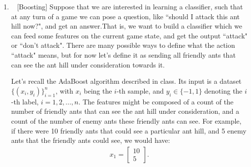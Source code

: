 \documentclass[10pt]{article}
\begin{document}
\begin{enumerate}[1.]
And with the definition of entropy: $H(\boldsymbol{X})=-\int p(\boldsymbol{x})\log p(\boldsymbol{x})d\boldsymbol{x}$, we can get that
$$-\int p(\boldsymbol{z}|\boldsymbol{X},\theta^{(t-1)})\log p(\boldsymbol{z}|\boldsymbol{X},\theta^{(t-1)})d\boldsymbol{z}=H(\boldsymbol{Z}|\boldsymbol{X},\theta^{(t-1)})$$

So 
$$\int p(\boldsymbol{z}|\boldsymbol{X},\theta^{(t-1)})\log p(\boldsymbol{X},\boldsymbol{z}|\theta)d\boldsymbol{z}-\int p(\boldsymbol{z}|\boldsymbol{X},\theta^{(t-1)})\log p(\boldsymbol{z}|\boldsymbol{X},\theta^{(t-1)})d\boldsymbol{z}$$
$$=Q(\theta|\theta^{(t-1)})+H(\boldsymbol{Z}|\boldsymbol{X},\theta^{(t-1)})$$

Since $H(\boldsymbol{Z}|\boldsymbol{X},\theta^{(t-1)})$ is a constant of $\theta$, so we can get that
$$\argmax\limits_{\theta} \mathbb{E}_{\boldsymbol{Z}|\boldsymbol{X},\theta^{(t-1)}}\left[\log \dfrac{p(\boldsymbol{X},\boldsymbol{Z}|\theta)}{p(\boldsymbol{Z}|\boldsymbol{X},\theta^{(t-1)})}\right]
=\argmax\limits_{\theta} Q(\theta|\theta^{(t-1)}) + H(\boldsymbol{Z}|\boldsymbol{X},\theta^{(t-1)})
=\argmax\limits_{\theta} Q(\theta|\theta^{(t-1)})$$

So above all, we have proved that
$$\argmax\limits_{\theta} Q(\theta|\theta^{(t-1)}) = \argmax\limits_{\theta} \mathbb{E}_{\boldsymbol{Z}|\boldsymbol{X},\theta^{(t-1)}}\left[\log \dfrac{p(\boldsymbol{X},\boldsymbol{Z}|\theta)}{p(\boldsymbol{Z}|\boldsymbol{X},\theta^{(t-1)})}\right]$$

\newpage

    \item ~ [Boosting]
        Suppose that we are interested in learning a classifier, such that at any turn of a game we can pose a question, like ``should I attack this ant hill now?", and get an answer.That is, we want to build a classifier which we can feed some features on the current game state, and get the output ``attack" or ``don't attack". There are many possible ways to define what the action ``attack" means, but for now let's define it as sending all friendly ants that can see the ant hill under consideration towards it.

	    Let's recall the AdaBoost algorithm described in class. Its input is a dataset $\{(x_{i},y_{i})\}_{i=1}^{n}$, with $x_i$ being the $i$-th sample, and $y_{i}\in \{-1,1\}$ denoting the $i$-th label, $i=1,2,...,n$. The features might be composed of a count of the number of friendly ants that can see the ant hill under consideration, and a count of the number of enemy ants these friendly ants can see. For example, if there were 10 friendly ants that could see a particular ant hill, and 5 enemy ants that the friendly ants could see, we would have:
	    \begin{align*}
		    x_1 = \begin{bmatrix}
			10 \\
			5
		    \end{bmatrix}.
	    \end{align*}


\end{enumerate}
\end{document}
